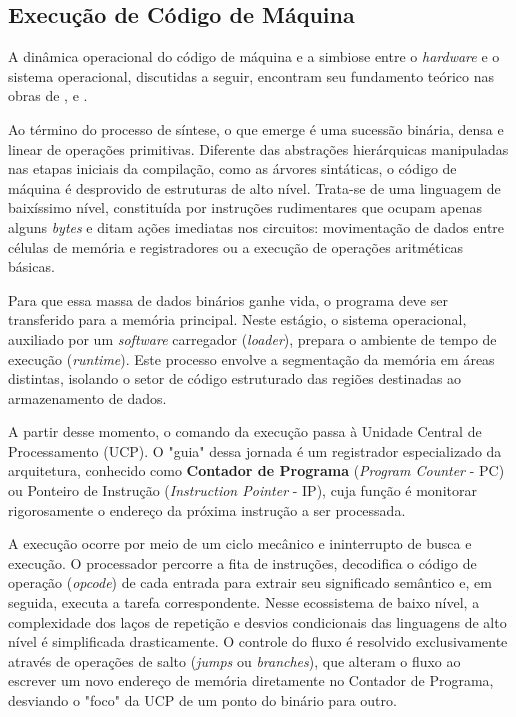 \subsection{Execução de Código de Máquina}

A dinâmica operacional do código de máquina e a simbiose entre o \textit{hardware} e o sistema operacional, discutidas a seguir, encontram seu fundamento teórico nas obras de ,  e .

Ao término do processo de síntese, o que emerge é uma sucessão binária, densa e linear de operações primitivas. Diferente das abstrações hierárquicas manipuladas nas etapas iniciais da compilação, como as árvores sintáticas, o código de máquina é desprovido de estruturas de alto nível. Trata-se de uma linguagem de baixíssimo nível, constituída por instruções rudimentares que ocupam apenas alguns \textit{bytes} e ditam ações imediatas nos circuitos: movimentação de dados entre células de memória e registradores ou a execução de operações aritméticas básicas.

Para que essa massa de dados binários ganhe vida, o programa deve ser transferido para a memória principal. Neste estágio, o sistema operacional, auxiliado por um \textit{software} carregador (\textit{loader}), prepara o ambiente de tempo de execução (\textit{runtime}). Este processo envolve a segmentação da memória em áreas distintas, isolando o setor de código estruturado das regiões destinadas ao armazenamento de dados.

A partir desse momento, o comando da execução passa à Unidade Central de Processamento (UCP). O "guia" dessa jornada é um registrador especializado da arquitetura, conhecido como \textbf{Contador de Programa} (\textit{Program Counter} - PC) ou Ponteiro de Instrução (\textit{Instruction Pointer} - IP), cuja função é monitorar rigorosamente o endereço da próxima instrução a ser processada.

A execução ocorre por meio de um ciclo mecânico e ininterrupto de busca e execução. O processador percorre a fita de instruções, decodifica o código de operação (\textit{opcode}) de cada entrada para extrair seu significado semântico e, em seguida, executa a tarefa correspondente. Nesse ecossistema de baixo nível, a complexidade dos laços de repetição e desvios condicionais das linguagens de alto nível é simplificada drasticamente. O controle do fluxo é resolvido exclusivamente através de operações de salto (\textit{jumps} ou \textit{branches}), que alteram o fluxo ao escrever um novo endereço de memória diretamente no Contador de Programa, desviando o "foco" da UCP de um ponto do binário para outro.

